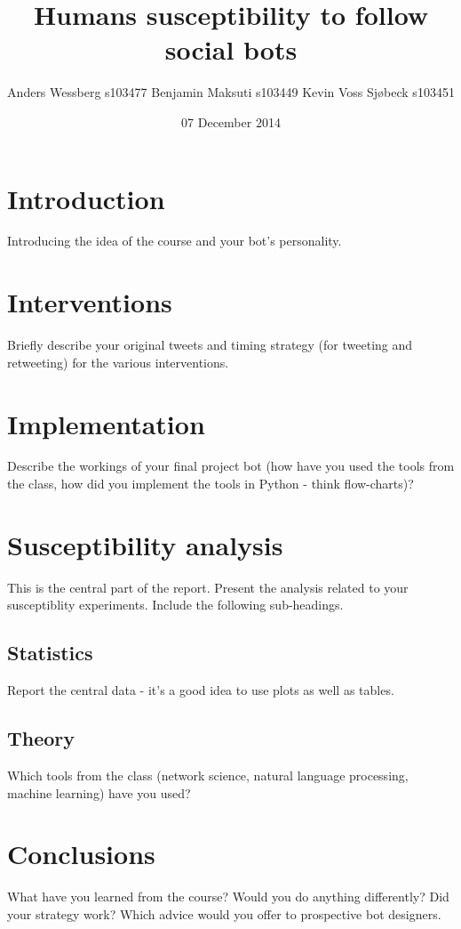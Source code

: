 \documentclass{acm_proc_article-sp}
\begin{document}
\title{Humans susceptibility to follow social bots}


\author{
\alignauthor
Anders Wessberg s103477
\alignauthor
Benjamin Maksuti s103449
\alignauthor
Kevin Voss Sj{\o}beck s103451
}
\date{07 December 2014}

\maketitle
\begin{abstract}



\end{abstract}

\section{Introduction}
Introducing the idea of the course and your bot's personality.\\

\section{Interventions}
Briefly describe your original tweets and timing strategy (for tweeting and retweeting) for the various interventions.\\

\section{Implementation}
Describe the workings of your final project bot (how have you used the tools from the class, how did you implement the tools in Python - think flow-charts)?\\

\section{Susceptibility analysis}
This is the central part of the report. Present the analysis related to your susceptiblity experiments. Include the following sub-headings.

\subsection{Statistics}
Report the central data - it's a good idea to use plots as well as tables.

\subsection{Theory}
Which tools from the class (network science, natural language processing, machine learning) have you used? 

\section{Conclusions}
What have you learned from the course? Would you do anything differently? Did your strategy work? Which advice would you offer to prospective bot designers.
\end{document}
